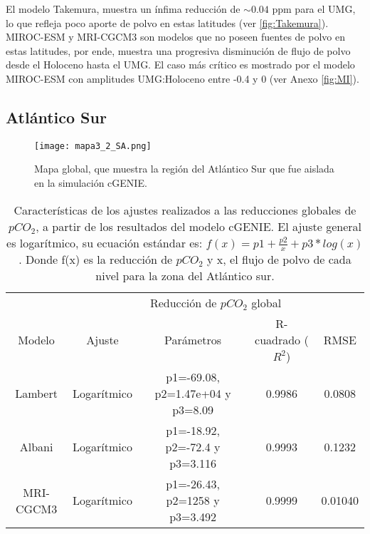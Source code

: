El modelo Takemura, muestra un ínfima reducción de $\sim 0.04$ ppm para el UMG, lo que refleja poco aporte de polvo en estas latitudes (ver \ref{fig:Takemura}). MIROC-ESM y MRI-CGCM3 son modelos que no poseen fuentes de polvo en estas latitudes, por ende, muestra una progresiva disminución de flujo de polvo desde el Holoceno hasta el UMG. El caso más crítico es mostrado por el modelo MIROC-ESM con amplitudes UMG:Holoceno entre -0.4 y 0 (ver Anexo \ref{fig:MI}).   

\subsection{Atl\'antico Sur}

\begin{figure}[H]
\centering
 \texttt{[image: mapa3\_2\_SA.png]}
 \caption[Figura región del Atlántico Sur]{Mapa global, que muestra la región del Atlántico Sur que fue aislada en la simulación cGENIE.}
  \label{fig:Mapa_SA}
\end{figure}

\begin{table}[H]
\centering
\begin{tabular}{|c|c|c|c|c|}
\hline
& \multicolumn{4}{c|}{Reducci\'on de $pCO_2$ global} \\
\cline{2-5}
Modelo& Ajuste & Par\'ametros & R-cuadrado ($R^2$) & RMSE\\
\hline \hline
Lambert  & Logar\'itmico  & p1=-69.08, p2=1.47e+04 y p3=8.09 & 0.9986 & 0.0808 \\ \hline
Albani & Logar\'itmico & p1=-18.92, p2=-72.4 y p3=3.116 & 0.9993 & 0.1232\\ \hline
MRI-CGCM3 & Logar\'itmico & p1=-26.43, p2=1258 y p3=3.492 & 0.9999 & 0.01040\\ \hline
\end{tabular}
\caption[Coeficientes ajuste SA]{Caracter\'isticas de los ajustes realizados a las reducciones globales de $pCO_2$, a partir de los resultados del modelo cGENIE. El ajuste general es logar\'itmico, 
su ecuaci\'on est\'andar es: $ f(x)=p1 + \frac{p2}{x} + p3*log(x)$. Donde f(x) es la reducci\'on de $pCO_2$ y x, el flujo de polvo de cada nivel para la zona del Atlántico sur. }
\label{tabla:Res5}
\end{table}

